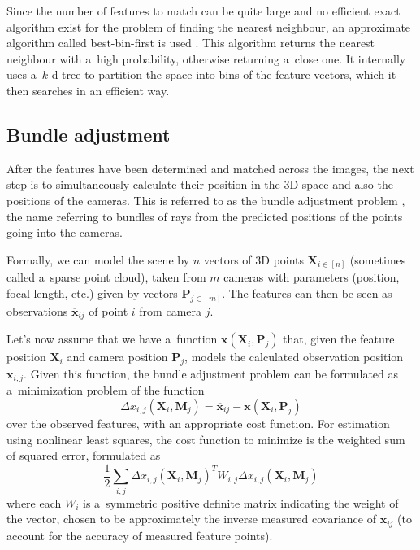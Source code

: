 Since the number of features to match can be quite large and no efficient exact algorithm exist for the problem of finding the nearest neighbour, an approximate algorithm called best-bin-first is used \cite{beis1997shape}.
This algorithm returns the nearest neighbour with a~high probability, otherwise returning a~close one.
It internally uses a~$k$-d tree to partition the space into bins of the feature vectors, which it then searches in an efficient way.

\subsection{Bundle adjustment}
After the features have been determined and matched across the images, the next step is to simultaneously calculate their position in the 3D space and also the positions of the cameras.
This is referred to as the bundle adjustment problem \cite{triggs1999bundle}, the name referring to bundles of rays from the predicted positions of the points going into the cameras.

Formally, we can model the scene by $n$ vectors of 3D points $\mathbf{X}_{i \in [n]}$ (sometimes called a~sparse point cloud), taken from $m$ cameras with parameters (position, focal length, etc.) given by vectors $\mathbf{P}_{j \in [m]}$.
The features can then be seen as observations $\overline{\bm{x}}_{ij}$ of point $i$ from camera $j$.

Let's now assume that we have a~function $\bm{x}(\mathbf{X}_i, \mathbf{P}_j)$ that, given the feature position $\mathbf{X}_i$ and camera position $\mathbf{P}_j$, models the calculated observation position $\mathbf{x}_{i, j}$.
Given this function, the bundle adjustment problem can be formulated as a~minimization problem of the function \begin{equation} \Delta x_{i, j} (\mathbf{X}_i, \mathbf{M}_j) = \overline{\bm{x}}_{ij} - \bm{x}(\mathbf{X}_i, \mathbf{P}_j) \end{equation} over the observed features, with an appropriate cost function. For estimation using nonlinear least squares, the cost function to minimize is the weighted sum of squared error, formulated as 
\begin{equation} \frac{1}{2} \sum_{i,j} \Delta x_{i, j} (\mathbf{X}_i, \mathbf{M}_j)^T W_{i,j} \Delta x_{i, j} (\mathbf{X}_i, \mathbf{M}_j) \end{equation}
where each $W_i$ is a~symmetric positive definite matrix indicating the weight of the vector, chosen to be approximately the inverse measured covariance of $\overline{\bm{x}}_{ij}$ (to account for the accuracy of measured feature points).

